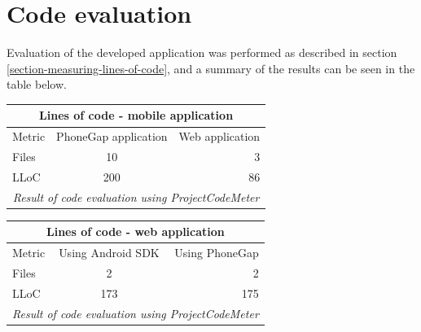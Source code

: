 \section{Code evaluation}\label{sec:code-evaluation}
Evaluation of the developed application was performed as described in section \ref{section-measuring-lines-of-code}, and a summary of the results  can be seen in the table below.

\begin{tabular}{ | l | c | r | }
    \hline
    \multicolumn{3}{|c|}{Lines of code - mobile application} \\
    \hline
	Metric & PhoneGap application &  Web application \\
	\hline
	Files & 10 & 3\\
	LLoC & 200 & 86\\	
	\hline
	\multicolumn{3}{c}{\emph{Result of code evaluation using ProjectCodeMeter}}
\end{tabular}

\begin{tabular}{ | l | c | r | }
    \hline
    \multicolumn{3}{|c|}{Lines of code - web application} \\
    \hline
	Metric & Using Android SDK & Using PhoneGap \\
	\hline
	Files & 2 & 2 \\
	LLoC & 173 & 175 \\	
	\hline
	\multicolumn{3}{c}{\emph{Result of code evaluation using ProjectCodeMeter}}
\end{tabular}

